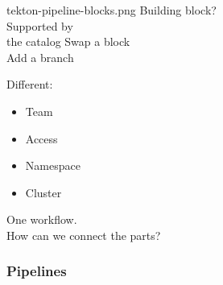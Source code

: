 \documentclass[aspectratio=169,11pt,hyperref={colorlinks=true}]{beamer}
\begin{document}
\begin{grayframe}
\begin{textblock*}{0.3\paperwidth}
  \end{textblock*}
\end{grayframe}

\begin{tpicstripedframe}%
  {tekton-pipeline-blocks.png}%
  {%
  Building block? \\
  \vspace{0.03\paperheight}
  Supported by \\the catalog
  }%
  {%
  Swap a block \\
  \vspace{0.03\paperheight}
  Add a branch
  }%
  {%
  Different:
  \begin{itemize}
    \item Team
    \item Access
    \item Namespace
    \item Cluster
  \end{itemize}
  }%
  {%
  One workflow. \\
  \vspace{0.03\paperheight}
  How can we connect the parts?
  }%
  \frametitle{Pipelines}
\end{tpicstripedframe}
\end{document}

